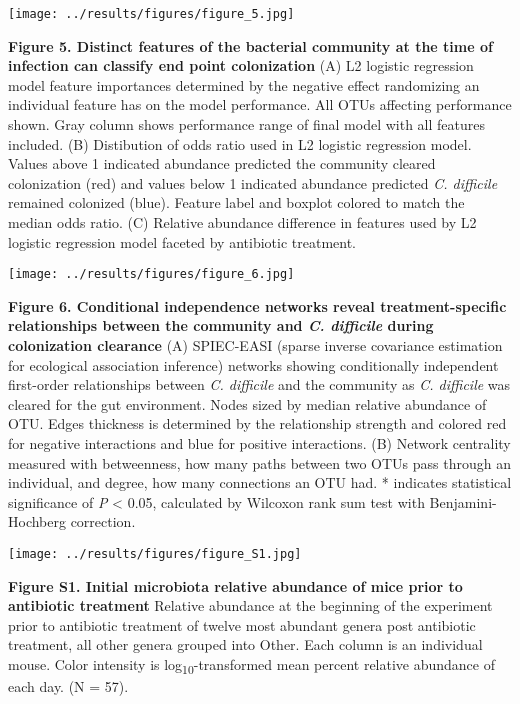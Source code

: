 \documentclass[11pt,]{article}
\begin{document}
\hfill\break

\texttt{[image: ../results/figures/figure\_5.jpg]}

\textbf{Figure 5. Distinct features of the bacterial community at the
time of infection can classify end point colonization} (A) L2 logistic
regression model feature importances determined by the negative effect
randomizing an individual feature has on the model performance. All OTUs
affecting performance shown. Gray column shows performance range of
final model with all features included. (B) Distibution of odds ratio
used in L2 logistic regression model. Values above 1 indicated abundance
predicted the community cleared colonization (red) and values below 1
indicated abundance predicted \emph{C. difficile} remained colonized
(blue). Feature label and boxplot colored to match the median odds
ratio. (C) Relative abundance difference in features used by L2 logistic
regression model faceted by antibiotic treatment.

\hfill\break

\texttt{[image: ../results/figures/figure\_6.jpg]}

\textbf{Figure 6. Conditional independence networks reveal
treatment-specific relationships between the community and \emph{C.
difficile} during colonization clearance} (A) SPIEC-EASI (sparse inverse
covariance estimation for ecological association inference) networks
showing conditionally independent first-order relationships between
\emph{C. difficile} and the community as \emph{C. difficile} was cleared
for the gut environment. Nodes sized by median relative abundance of
OTU. Edges thickness is determined by the relationship strength and
colored red for negative interactions and blue for positive
interactions. (B) Network centrality measured with betweenness, how many
paths between two OTUs pass through an individual, and degree, how many
connections an OTU had. * indicates statistical significance of \emph{P}
\textless{} 0.05, calculated by Wilcoxon rank sum test with
Benjamini-Hochberg correction.

\hfill\break

\texttt{[image: ../results/figures/figure\_S1.jpg]}

\textbf{Figure S1. Initial microbiota relative abundance of mice prior
to antibiotic treatment} Relative abundance at the beginning of the
experiment prior to antibiotic treatment of twelve most abundant genera
post antibiotic treatment, all other genera grouped into Other. Each
column is an individual mouse. Color intensity is
log\textsubscript{10}-transformed mean percent relative abundance of
each day. (N = 57).
\end{document}
